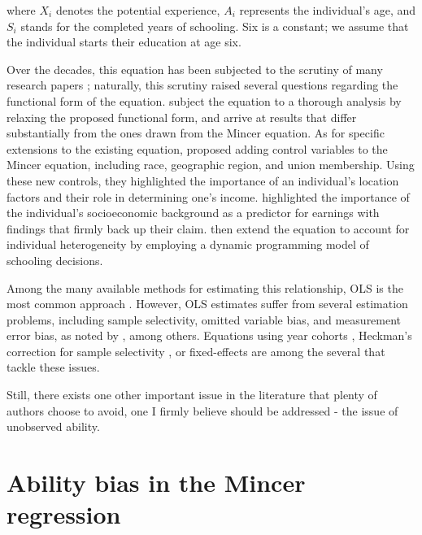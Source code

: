 where $X_i$ denotes the potential experience, $A_i$ represents the individual's age, and $S_i$ stands for the completed years of schooling. Six is a constant; we assume that the individual starts their education at age six.

Over the decades, this equation has been subjected to the scrutiny of many research papers \citep{ashenfelter1994estimates, heckman2006earnings, card1992does}; naturally, this scrutiny raised several questions regarding the functional form of the equation.
\cite{heckman2003fifty} subject the equation to a thorough analysis by relaxing the proposed functional form, and arrive at results that differ substantially from the ones drawn from the Mincer equation. As for specific extensions to the existing equation, \cite{card1999causal} proposed adding control variables to the Mincer equation, including race, geographic region, and union membership. Using these new controls, they highlighted the importance of an individual's location factors and their role in determining one's income. \cite{psacharopoulos2004returns} highlighted the importance of the individual's socioeconomic background as a predictor for earnings with findings that firmly back up their claim. \cite{belzil2004earnings} then extend the equation to account for individual heterogeneity by employing a dynamic programming model of schooling decisions.

Among the many available methods for estimating this relationship, OLS is the most common approach \citep{ashenfelter1999review, card1999causal}. However, OLS estimates suffer from several estimation problems, including sample selectivity, omitted variable bias, and measurement error bias, as noted by \cite{aslam2007rates}, among others. Equations using year cohorts \citep{angrist2009mostly}, Heckman's correction for sample selectivity \citep{heckman1979sample}, or fixed-effects are among the several that tackle these issues.

Still, there exists one other important issue in the literature that plenty of authors choose to avoid, one I firmly believe should be addressed - the issue of unobserved ability.

\section{Ability bias in the Mincer regression}
\label{sec:ability_bias_and_mincer}

